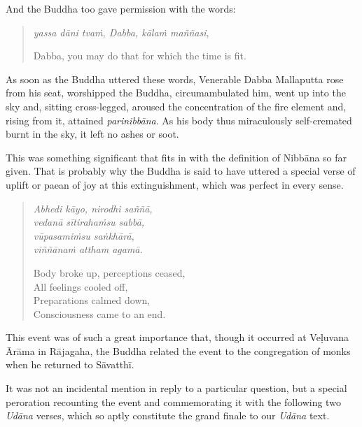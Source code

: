 And the Buddha too gave permission with the words:

\begin{quote}
\emph{yassa dāni tvaṁ, Dabba, kālaṁ maññasi},

Dabba, you may do that for which the time is fit.
\end{quote}

As soon as the Buddha uttered these words, Venerable Dabba Mallaputta rose from his seat, worshipped the Buddha, circumambulated him, went up into the sky and, sitting cross-legged, aroused the concentration of the fire element and, rising from it, attained \emph{parinibbāna}. As his body thus miraculously self-cremated burnt in the sky, it left no ashes or soot.

This was something significant that fits in with the definition of Nibbāna so far given. That is probably why the Buddha is said to have uttered a special verse of uplift or paean of joy at this extinguishment, which was perfect in every sense.

\begin{quote}
\emph{Abhedi kāyo, nirodhi saññā,}\\
\emph{vedanā sītirahaṁsu sabbā,}\\
\emph{vūpasamiṁsu saṅkhārā,}\\
\emph{viññānaṁ attham agamā.}

Body broke up, perceptions ceased,\\
All feelings cooled off,\\
Preparations calmed down,\\
Consciousness came to an end.
\end{quote}

This event was of such a great importance that, though it occurred at Veḷuvana Ārāma in Rājagaha, the Buddha related the event to the congregation of monks when he returned to Sāvatthī.

It was not an incidental mention in reply to a particular question, but a special peroration recounting the event and commemorating it with the following two \emph{Udāna} verses, which so aptly constitute the grand finale to our \emph{Udāna} text.

